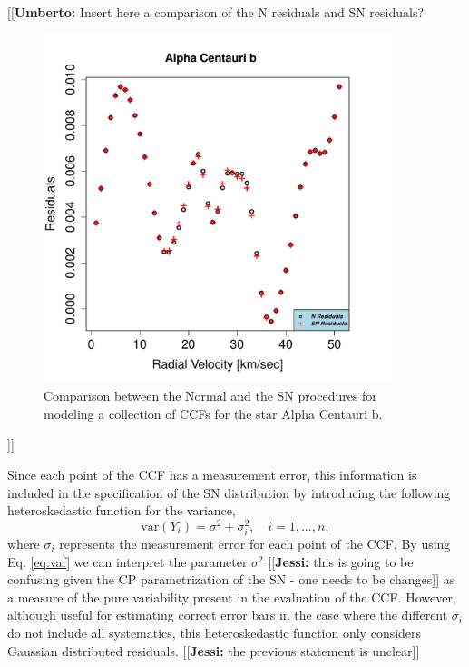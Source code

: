 \documentclass[11pt, oneside]{article}
\newcommand{\jessi}[1]{{\color{Purple}[[\textbf{Jessi: }#1]]}}
\newcommand{\umberto}[1]{{\color{green}[[\textbf{Umberto: }#1]]}}
\begin{document}
\umberto{Insert here a comparison of the N residuals and SN residuals?

\begin{figure}[htbp]
   \centering
\includegraphics[height = 4in]{[1]HD128621Residuals.pdf} 
   \caption{Comparison between the Normal and the SN procedures for modeling a collection of CCFs for the star Alpha Centauri b.}
    \label{fig:Residual.comparison}
\end{figure}

}

\iffalse
Since each point of the CCF has a measurement error, this information is included in the specification of the SN distribution by introducing the following heteroskedastic function for the variance,
%
\begin{equation}
\text{var}(Y_{i})=\sigma^{2}+\sigma_{i}^{2}, \quad i = 1, \dots, n,
\label{eq:vaf}
\end{equation}
%
where $\sigma_{i}$ represents the measurement error for each point of the CCF. By using Eq. \ref{eq:vaf} we can interpret the parameter $\sigma^{2}$ \jessi{this is going to be confusing given the CP parametrization of the SN - one needs to be changes} as a measure of the pure variability present in the evaluation of the CCF. 
However, although useful for estimating correct error bars in the case where the different $\sigma_{i}$ do not include all systematics, this heteroskedastic function only considers Gaussian distributed residuals. \jessi{the previous statement is unclear}
%
\end{document}
